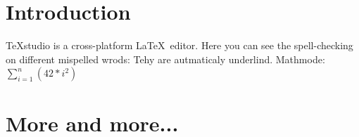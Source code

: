 \documentclass[10pt,a4paper]{article}
\begin{document}
\section{Introduction}
TeXstudio is a cross-platform \LaTeX ~editor.
Here you can see the spell-checking on different mispelled wrods: Tehy are autmaticaly underlind.
Mathmode: $\sum\limits^n_{i=1}\left(42*i^2\right)$
\section{More and more...}
\end{document}
